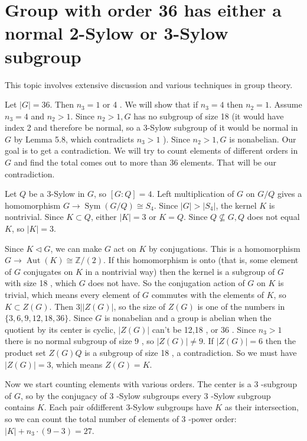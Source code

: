 \section{Group with order 36 has either a normal 2-Sylow or 3-Sylow subgroup}

\begin{note}
This topic involves extensive discussion and various techniques in group theory.
\end{note}
Let $|G|=36$. Then $n_3=1$ or 4 . We will show that if $n_3=4$ then $n_2=1$. Assume $n_3=4$ and $n_2>1$. Since $n_2>1, G$ has no subgroup of size 18 (it would have index 2 and therefore be normal, so a 3-Sylow subgroup of it would be normal in $G$ by Lemma 5.8, which contradicts $n_3>1$ ). Since $n_2>1, G$ is nonabelian. Our goal is to get a contradiction. We will try to count elements of different orders in $G$ and find the total comes out to more than 36 elements. That will be our contradiction.

Let $Q$ be a 3-Sylow in $G$, so $[G: Q]=4$. Left multiplication of $G$ on $G / Q$ gives a homomorphism $G \rightarrow \operatorname{Sym}(G / Q) \cong S_4$. Since $|G|>\left|S_4\right|$, the kernel $K$ is nontrivial. Since $K \subset Q$, either $|K|=3$ or $K=Q$. Since $Q \nsubseteq G, Q$ does not equal $K$, so $|K|=3$.

Since $K \triangleleft G$, we can make $G$ act on $K$ by conjugations. This is a homomorphism $G \rightarrow \operatorname{Aut}(K) \cong \mathbb{Z} /(2)$. If this homomorphism is onto (that is, some element of $G$ conjugates on $K$ in a nontrivial way) then the kernel is a subgroup of $G$ with size 18 , which $G$ does not have. So the conjugation action of $G$ on $K$ is trivial, which means every element of $G$ commutes with the elements of $K$, so $K \subset Z(G)$. Then $3||Z(G)|$, so the size of $Z(G)$ is one of the numbers in $\{3,6,9,12,18,36\}$. Since $G$ is nonabelian and a group is abelian when the quotient by its center is cyclic, $|Z(G)|$ can't be 12,18 , or 36 . Since $n_3>1$ there is no normal subgroup of size 9 , so $|Z(G)| \neq 9$. If $|Z(G)|=6$ then the product set $Z(G) Q$ is a subgroup of size 18 , a contradiction. So we must have $|Z(G)|=3$, which means $Z(G)=K$.

Now we start counting elements with various orders. The center is a 3 -subgroup of $G$, so by the conjugacy of 3 -Sylow subgroups every 3 -Sylow subgroup contains $K$. Each pair ofdifferent 3-Sylow subgroups have $K$ as their intersection, so we can count the total number of elements of 3 -power order: $|K|+n_3 \cdot(9-3)=27$.

